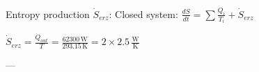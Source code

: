 Entropy production \( \dot{S}_{erz} \):  
Closed system:  
\( \frac{dS}{dt} = \sum \frac{\dot{Q}_i}{T_i} + \dot{S}_{erz} \)  

\( \dot{S}_{erz} = \frac{\dot{Q}_{out}}{T} = \frac{62300 \, \text{W}}{293.15 \, \text{K}} = 2 \times 2.5 \, \frac{\text{W}}{\text{K}} \)  

---